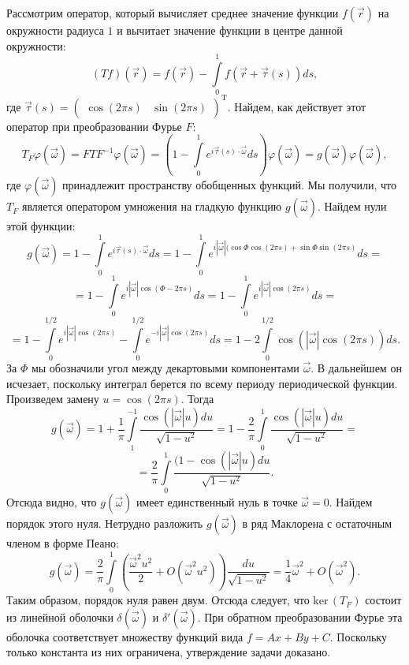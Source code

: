 \documentclass{article}
\begin{document}
Рассмотрим оператор, который вычисляет среднее значение функции $f(\vec{r})$ на окружности радиуса $1$ и вычитает значение функции в центре данной окружности:
$$(Tf) (\vec{r}) = f(\vec{r}) - \int\limits_{0}^{1} f(\vec{r} + \vec{\tau} (s)) ds,$$
где $\vec{\tau} (s) = (\begin{array}{cc} \cos (2\pi s) & \sin (2\pi s) \end{array})^\mathrm{T}$.
Найдем, как действует этот оператор при преобразовании Фурье $F$:
$$T_{F} \varphi (\vec{\omega}) = F T F^{-1} \varphi (\vec{\omega}) = \left(1 - \int\limits_{0}^{1} e^{i \vec{\tau} (s) \cdot \vec{\omega}} ds \right) \varphi (\vec{\omega}) = g(\vec{\omega}) \varphi (\vec{\omega}),$$
где $\varphi (\vec{\omega})$ принадлежит пространству обобщенных функций. Мы получили, что $T_F$ является оператором умножения на гладкую функцию $g(\vec{\omega})$. Найдем нули этой функции:
$$g(\vec{\omega}) =  1 - \int\limits_{0}^{1} e^{i \vec{\tau} (s) \cdot \vec{\omega}} ds = 1 - \int\limits_{0}^{1} e^{i |\vec{\omega}| (\cos \Phi \cos (2\pi s) +\sin \Phi  \sin (2\pi s)}ds = $$
$$ = 1 - \int\limits_{0}^{1} e^{i |\vec{\omega}| \cos (\Phi - 2\pi s)}ds = 1 - \int\limits_{0}^{1} e^{i |\vec{\omega}| \cos (2\pi s)}ds = $$
$$ = 1 - \int\limits_{0}^{1/2} e^{i |\vec{\omega}| \cos (2\pi s)} - \int\limits_{0}^{1/2} e^{-i |\vec{\omega}| \cos (2\pi s)}ds = 1 - 2 \int\limits_{0}^{1/2} \cos(|\vec{\omega}| \cos (2\pi s))ds.$$
За $\Phi$ мы обозначили угол между декартовыми компонентами $\vec{\omega}$. В дальнейшем он исчезает, поскольку интеграл берется по всему периоду периодической функции. Произведем замену $u = \cos (2\pi s)$. Тогда
$$g(\vec{\omega}) = 1 + \frac{1}{\pi} \int\limits_{1}^{-1} \frac{\cos(|\vec{\omega}| u) du}{\sqrt{1 - u^2}} = 1 - \frac{2}{\pi} \int\limits_{0}^{1} \frac{\cos(|\vec{\omega}| u) du}{\sqrt{1 - u^2}} = $$
$$ = \frac{2}{\pi} \int\limits_0^1 \frac{(1 - \cos(|\vec{\omega}| u) du}{\sqrt{1 - u^2}}.$$
Отсюда видно, что $g(\vec{\omega})$ имеет единственный нуль в точке $\vec{\omega} = 0$. Найдем порядок этого нуля. Нетрудно разложить $g(\vec{\omega})$ в ряд Маклорена с остаточным членом в форме Пеано:
$$g(\vec{\omega}) = \frac{2}{\pi} \int\limits_0^1 \left(\frac{\vec{\omega}^2u^2}{2} + O(\vec{\omega}^2u^2) \right) \frac{du}{\sqrt{1 - u^2}} = \frac14 \vec{\omega}^2 + O(\vec{\omega}^2).$$
Таким образом, порядок нуля равен двум. Отсюда следует, что $\text{ker}\, (T_F)$ состоит из линейной оболочки $\delta(\vec{\omega})$ и $\delta'(\vec{\omega})$. При обратном преобразовании Фурье эта оболочка соответствует множеству функций вида $f = Ax + By + C$. Поскольку только константа из них ограничена, утверждение задачи доказано.
\end{document}
